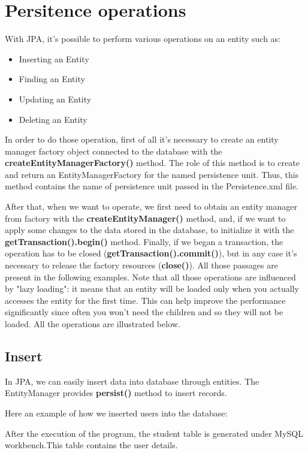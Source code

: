 \documentclass[a4paper]{article}
\begin{document}
\section{Persitence operations}
With JPA, it's possible to perform various operations on an entity such as:

\begin{itemize}
\item{Inserting an Entity}
\item{Finding an Entity}
\item{Updating an Entity}
\item{Deleting an Entity}
\end{itemize}

In order to do those operation, first of all it's necessary to create an entity manager factory object connected to the database with the \textbf{createEntityManagerFactory()} method. The role of this method is to create and return an EntityManagerFactory for the named persistence unit. Thus, this method contains the name of persistence unit passed in the Persistence.xml file.

After that, when we want to operate, we first need to obtain an entity manager from factory with the \textbf{createEntityManager()} method, and, if we want to apply some changes to the data stored in the database, to initialize it with the \textbf{getTransaction().begin()} method. Finally, if we began a transaction, the operation has to be closed (\textbf{getTransaction().commit()}), but in any case it's necessary to release the factory resources (\textbf{close()}).
All those passages are present in the following examples.
Note that all those operations are influenced by "lazy loading": it means that an entity will be loaded only when you actually accesses the entity for the first time. This can help improve the performance significantly since often you won't need the children and so they will not be loaded.
All the operations are illustrated below.

\subsection{Insert}
In JPA, we can easily insert data into database through entities. The EntityManager provides \textbf{persist()} method to insert records.

Here an example of how we inserted users into the database:

After the execution of the program, the student table is generated under MySQL workbench.This table contains the user details.
\end{document}
